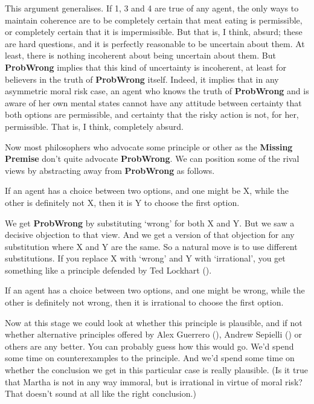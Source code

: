 \documentclass[
  11pt,
  letterpaper,
  DIV=11,
  numbers=noendperiod,
  twoside]{scrartcl}
\providecommand{\tightlist}{%
  \setlength{\itemsep}{0pt}\setlength{\parskip}{0pt}}
\begin{document}
This argument generalises. If 1, 3 and 4 are true of any agent, the only
ways to maintain coherence are to be completely certain that meat eating
is permissible, or completely certain that it is impermissible. But that
is, I think, absurd; these are hard questions, and it is perfectly
reasonable to be uncertain about them. At least, there is nothing
incoherent about being uncertain about them. But \textbf{ProbWrong}
implies that this kind of uncertainty is incoherent, at least for
believers in the truth of \textbf{ProbWrong} itself. Indeed, it implies
that in any asymmetric moral risk case, an agent who knows the truth of
\textbf{ProbWrong} and is aware of her own mental states cannot have any
attitude between certainty that both options are permissible, and
certainty that the risky action is not, for her, permissible. That is, I
think, completely absurd.

Now most philosophers who advocate some principle or other as the
\textbf{Missing Premise} don't quite advocate \textbf{ProbWrong}. We can
position some of the rival views by abstracting away from
\textbf{ProbWrong} as follows.

\begin{description}
\tightlist
\item[General Principle]
If an agent has a choice between two options, and one might be X, while
the other is definitely not X, then it is Y to choose the first option.
\end{description}

We get \textbf{ProbWrong} by substituting `wrong' for both X and Y. But
we saw a decisive objection to that view. And we get a version of that
objection for any substitution where X and Y are the same. So a natural
move is to use different substitutions. If you replace X with `wrong'
and Y with `irrational', you get something like a principle defended by
Ted Lockhart ().

\begin{description}
\tightlist
\item[What Might be Wrong Is Irrational]
If an agent has a choice between two options, and one might be wrong,
while the other is definitely not wrong, then it is irrational to choose
the first option.
\end{description}

Now at this stage we could look at whether this principle is plausible,
and if not whether alternative principles offered by Alex Guerrero
(), Andrew Sepielli
() or others are any better. You can
probably guess how this would go. We'd spend some time on
counterexamples to the principle. And we'd spend some time on whether
the conclusion we get in this particular case is really plausible. (Is
it true that Martha is not in any way immoral, but is irrational in
virtue of moral risk? That doesn't sound at all like the right
conclusion.)
\end{document}
